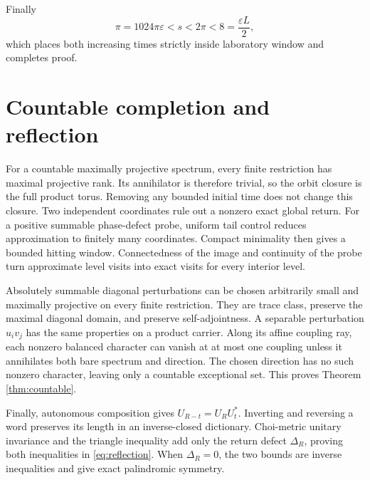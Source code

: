 Finally
\[
 \pi=1024\pi\varepsilon<s<2\pi<8
 =\frac{\varepsilon L}{2},
\]
which places both increasing times strictly inside laboratory window and
completes proof.

\section{Countable completion and reflection}

For a countable maximally projective spectrum, every finite restriction has
maximal projective rank.  Its annihilator is therefore trivial, so the orbit
closure is the full product torus.  Removing any bounded initial time does
not change this closure.  Two independent coordinates rule out a nonzero
exact global return.  For a positive summable phase-defect probe, uniform
tail control reduces approximation to finitely many coordinates.  Compact
minimality then gives a bounded hitting window.  Connectedness of the image
and continuity of the probe turn approximate level visits into exact visits
for every interior level.

Absolutely summable diagonal perturbations can be chosen arbitrarily small
and maximally projective on every finite restriction.  They are trace class,
preserve the maximal diagonal domain, and preserve self-adjointness.  A
separable perturbation $u_i v_j$ has the same properties on a product
carrier.  Along its affine coupling ray, each nonzero balanced character can
vanish at at most one coupling unless it annihilates both bare spectrum and
direction.  The chosen direction has no such nonzero character, leaving only
a countable exceptional set.  This proves Theorem \ref{thm:countable}.

Finally, autonomous composition gives
$U_{R-t}=U_RU_t^*$.  Inverting and reversing a word preserves its length in
an inverse-closed dictionary.  Choi-metric unitary invariance and the
triangle inequality add only the return defect $\Delta_R$, proving both
inequalities in \eqref{eq:reflection}.  When $\Delta_R=0$, the two bounds are
inverse inequalities and give exact palindromic symmetry.
